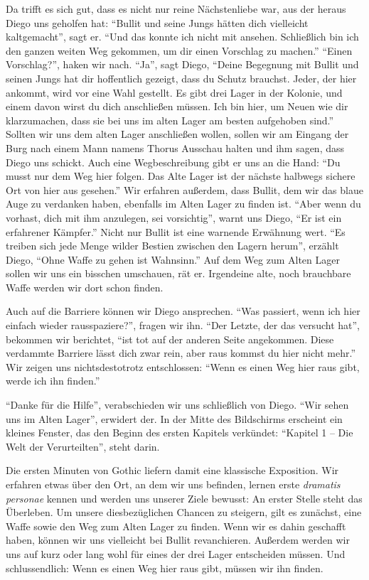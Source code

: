 \documentclass[a5paper,pagesize,numbers=noenddot]{scrbook}
\begin{document}
Da trifft es sich gut, dass es nicht nur reine Nächstenliebe war, aus der heraus Diego uns geholfen hat:
\enquote{Bullit und seine Jungs hätten dich vielleicht kaltgemacht}, sagt er.
\enquote{Und das konnte ich nicht mit ansehen.
Schließlich bin ich den ganzen weiten Weg gekommen, um dir einen Vorschlag zu machen.}
\enquote{Einen Vorschlag?}, haken wir nach.
\enquote{Ja}, sagt Diego, \enquote{Deine Begegnung mit Bullit und seinen Jungs hat dir hoffentlich gezeigt, dass du Schutz brauchst.
Jeder, der hier ankommt, wird vor eine Wahl gestellt.
Es gibt drei Lager in der Kolonie, und einem davon wirst du dich anschließen müssen.
Ich bin hier, um Neuen wie dir klarzumachen, dass sie bei uns im alten Lager am besten aufgehoben sind.}
Sollten wir uns dem alten Lager anschließen wollen, sollen wir am Eingang der Burg nach einem Mann namens Thorus Ausschau halten und ihm sagen, dass Diego uns schickt.
Auch eine Wegbeschreibung gibt er uns an die Hand:
\enquote{Du musst nur dem Weg hier folgen.
Das Alte Lager ist der nächste halbwegs sichere Ort von hier aus gesehen.}
Wir erfahren außerdem, dass Bullit, dem wir das blaue Auge zu verdanken haben, ebenfalls im Alten Lager zu finden ist.
\enquote{Aber wenn du vorhast, dich mit ihm anzulegen, sei vorsichtig}, warnt uns Diego, \enquote{Er ist ein erfahrener Kämpfer.}
Nicht nur Bullit ist eine warnende Erwähnung wert.
\enquote{Es treiben sich jede Menge wilder Bestien zwischen den Lagern herum}, erzählt Diego, \enquote{Ohne Waffe zu gehen ist Wahnsinn.}
Auf dem Weg zum Alten Lager sollen wir uns ein bisschen umschauen, rät er.
Irgendeine alte, noch brauchbare Waffe werden wir dort schon finden.

Auch auf die Barriere können wir Diego ansprechen.
\enquote{Was passiert, wenn ich hier einfach wieder rausspaziere?}, fragen wir ihn.
\enquote{Der Letzte, der das versucht hat}, bekommen wir berichtet, \enquote{ist tot auf der anderen Seite angekommen.
Diese verdammte Barriere lässt dich zwar rein, aber raus kommst du hier nicht mehr.}
Wir zeigen uns nichtsdestotrotz entschlossen:
\enquote{Wenn es einen Weg hier raus gibt, werde ich ihn finden.}

\enquote{Danke für die Hilfe}, verabschieden wir uns schließlich von Diego.
\enquote{Wir sehen uns im Alten Lager}, erwidert der.
In der Mitte des Bildschirms erscheint ein kleines Fenster, das den Beginn des ersten Kapitels verkündet:
\enquote{Kapitel 1 -- Die Welt der Verurteilten}, steht darin.

Die ersten Minuten von Gothic liefern damit eine klassische Exposition.
Wir erfahren etwas über den Ort, an dem wir uns befinden, lernen erste \textit{dramatis personae} kennen und werden uns unserer Ziele bewusst:
An erster Stelle steht das Überleben.
Um unsere diesbezüglichen Chancen zu steigern, gilt es zunächst, eine Waffe sowie den Weg zum Alten Lager zu finden.
Wenn wir es dahin geschafft haben, können wir uns vielleicht bei Bullit revanchieren.
Außerdem werden wir uns auf kurz oder lang wohl für eines der drei Lager entscheiden müssen.
Und schlussendlich:
Wenn es einen Weg hier raus gibt, müssen wir ihn finden.
\end{document}
